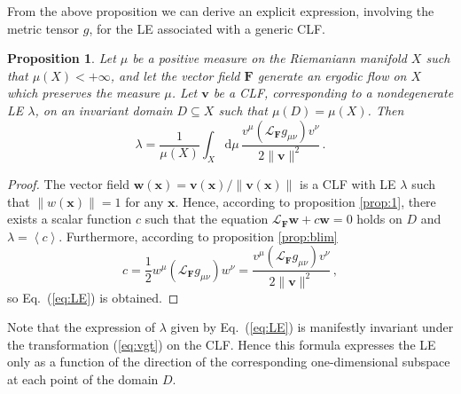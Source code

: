 \documentclass{article}
\theoremstyle{plain}
\newtheorem{proposition}[theorem]{Proposition}
\theoremstyle{definition}
\theoremstyle{remark}
\newcommand{\vect}[1]{\boldsymbol{#1}}
\begin{document}
From the above proposition we can derive an explicit expression, involving the metric 
tensor $g$, for the LE associated with a generic CLF.

\begin{proposition}  \label{prop:LE}
Let $\mu$ be a positive measure on the Riemaniann manifold $X$ such
that $\mu(X)<+\infty$, and let the vector field $\vect{F}$ generate an
ergodic flow on $X$ which preserves the measure $\mu$.  Let $\vect{v}$
be a CLF, corresponding to a nondegenerate LE $\lambda$, on an
invariant domain \mbox{$D\subseteq X$} such that $\mu(D)=\mu(X)$.
Then
\begin{equation}\label{eq:LE}
   \lambda=  \frac {1}{\mu(X)}
    \int_X \mathrm{d}\mu\,
\frac{v^\mu \left(\mathcal{L}_{\vect{F}} g_{\mu\nu}\right) v^\nu}
{2\lVert \vect{v}\rVert^2} \, .
  \end{equation}
\end{proposition}

\begin{proof}
The vector field $\vect w(\vect x)=\vect v(\vect x)/
\lVert \vect v(\vect x)\rVert$ is a CLF with LE $\lambda$ such that
$\lVert w(\vect x)\rVert =1$ for any $\vect x$. Hence, 
according to proposition \ref{prop:1}, there exists a scalar function $c$
such that the equation $\mathcal{L}_{\vect{F}} \vect{w} + c \vect w = 0$
holds on $D$ and $\lambda=\left<c\right>$. Furthermore, according to
proposition \ref{prop:blim}
\begin{equation}\label{eq:cscalar}
c= \frac 12
w^\mu \left(\mathcal{L}_{\vect{F}} g_{\mu\nu}\right) w^\nu
=\frac{v^\mu \left(\mathcal{L}_{\vect{F}} g_{\mu\nu}\right) v^\nu}
{2\lVert \vect{v}\rVert^2}\,,
\end{equation}
so Eq.~(\ref{eq:LE}) is obtained.
\end{proof}

Note that the expression of $\lambda$ given by Eq.~(\ref{eq:LE}) is
manifestly invariant under the transformation (\ref{eq:vgt}) on the CLF.
Hence this formula expresses the LE only as a function of the direction of
the corresponding one-dimensional subspace at each point of the domain $D$.
\end{document}
